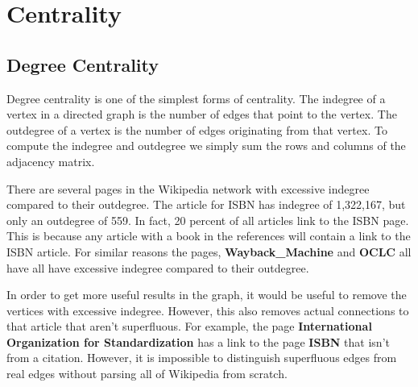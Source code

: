 \documentclass{article}
\begin{document}
\section*{Centrality}

\subsection{Degree Centrality}

Degree centrality is one of the simplest forms of centrality. The indegree of a vertex in a directed graph is the number of edges that point to the vertex. The outdegree of a vertex is the number of edges originating from that vertex.
To compute the indegree and outdegree we simply sum the rows and columns of the adjacency matrix.


There are several pages in the Wikipedia network with excessive indegree compared to their outdegree. The article for ISBN has indegree of 1,322,167, but only an outdegree of 559. In fact, 20 percent of all articles link to the ISBN page. This is because any article with a book in the references will contain a link to the ISBN article.
For similar reasons the pages, \textbf{Wayback\_Machine} and \textbf{OCLC} all have all have excessive indegree compared to their outdegree.

In order to get more useful results in the graph, it would be useful to remove the vertices with excessive indegree. However, this also removes actual connections to that article that aren't superfluous. For example, the page \textbf{International Organization for Standardization} has a link to the page \textbf{ISBN} that isn't from a citation. However, it is impossible to distinguish superfluous edges from real edges without parsing all of Wikipedia from scratch.
\end{document}
